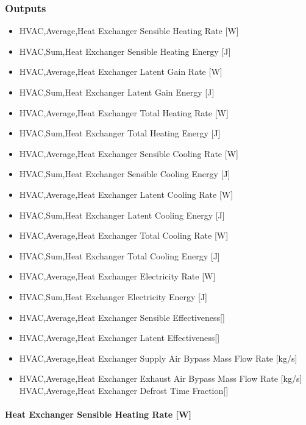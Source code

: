 \subsubsection{Outputs}\label{outputs-1-012}

\begin{itemize}
\item
  HVAC,Average,Heat Exchanger Sensible Heating Rate {[}W{]}
\item
  HVAC,Sum,Heat Exchanger Sensible Heating Energy {[}J{]}
\item
  HVAC,Average,Heat Exchanger Latent Gain Rate {[}W{]}
\item
  HVAC,Sum,Heat Exchanger Latent Gain Energy {[}J{]}
\item
  HVAC,Average,Heat Exchanger Total Heating Rate {[}W{]}
\item
  HVAC,Sum,Heat Exchanger Total Heating Energy {[}J{]}
\item
  HVAC,Average,Heat Exchanger Sensible Cooling Rate {[}W{]}
\item
  HVAC,Sum,Heat Exchanger Sensible Cooling Energy {[}J{]}
\item
  HVAC,Average,Heat Exchanger Latent Cooling Rate {[}W{]}
\item
  HVAC,Sum,Heat Exchanger Latent Cooling Energy {[}J{]}
\item
  HVAC,Average,Heat Exchanger Total Cooling Rate {[}W{]}
\item
  HVAC,Sum,Heat Exchanger Total Cooling Energy {[}J{]}
\item
  HVAC,Average,Heat Exchanger Electricity Rate {[}W{]}
\item
  HVAC,Sum,Heat Exchanger Electricity Energy {[}J{]}
\item
  HVAC,Average,Heat Exchanger Sensible Effectiveness{[]}
\item
  HVAC,Average,Heat Exchanger Latent Effectiveness{[]}
\item
  HVAC,Average,Heat Exchanger Supply Air Bypass Mass Flow Rate {[}kg/s{]}
\item
  HVAC,Average,Heat Exchanger Exhaust Air Bypass Mass Flow Rate {[}kg/s{]} HVAC,Average,Heat Exchanger Defrost Time Fraction{[]}
\end{itemize}

\paragraph{Heat Exchanger Sensible Heating Rate {[}W{]}}\label{heat-exchanger-sensible-heating-rate-w-1}

